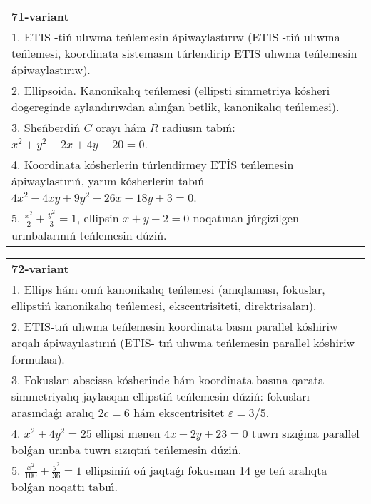 \documentclass{article}
\begin{document}
\begin{tabular}{m{17cm}}
\textbf{71-variant}\\
1. ETIS -tiń ulıwma teńlemesin ápiwaylastırıw (ETIS -tiń ulıwma teńlemesi, koordinata sistemasın túrlendirip ETIS ulıwma teńlemesin ápiwaylastırıw).\\

2. Ellipsoida. Kanonikalıq teńlemesi (ellipsti simmetriya kósheri dogereginde aylandırıwdan alınǵan betlik, kanonikalıq teńlemesi).\\

3. Sheńberdiń $C$ orayı hám $R$ radiusın tabıń: $x^2+y^2-2 x+4 y-20=0$.\\

4. Koordinata kósherlerin túrlendirmey ETİS teńlemesin ápiwaylastırıń, yarım kósherlerin tabıń $4x^{2} - 4xy + 9y^{2} - 26x - 18y + 3 = 0$.\\

5. $\frac{x^{2}}{2} + \frac{y^{2}}{3} = 1$, ellipsin $x + y - 2 = 0$ noqatınan júrgizilgen urınbalarınıń teńlemesin dúziń.  
\end{tabular}
\vspace{1cm}


\begin{tabular}{m{17cm}}
\textbf{72-variant}\\
1. Ellips hám onıń kanonikalıq teńlemesi (anıqlaması, fokuslar, ellipstiń kanonikalıq teńlemesi, ekscentrisiteti, direktrisaları).\\

2. ETIS-tıń ulıwma teńlemesin koordinata basın parallel kóshiriw arqalı ápiwayılastırıń (ETIS- tıń ulıwma teńlemesin parallel kóshiriw formulası).\\

3. Fokusları abscissa kósherinde hám koordinata basına qarata simmetriyalıq jaylasqan ellipstiń teńlemesin dúziń: fokusları arasındaǵı aralıq $2 c=6$ hám ekscentrisitet $\varepsilon=3/5$.\\

4. $x^{2} + 4y^{2} = 25$ ellipsi menen $4x - 2y + 23 = 0$ tuwrı sızıǵına parallel bolǵan urınba tuwrı sızıqtıń teńlemesin dúziń.  \\

5. $\frac{x^{2}}{100} + \frac{y^{2}}{36} = 1$ ellipsiniń oń jaqtaǵı fokusınan 14 ge teń aralıqta bolǵan noqattı tabıń.  
\end{tabular}
\vspace{1cm}
\end{document}

